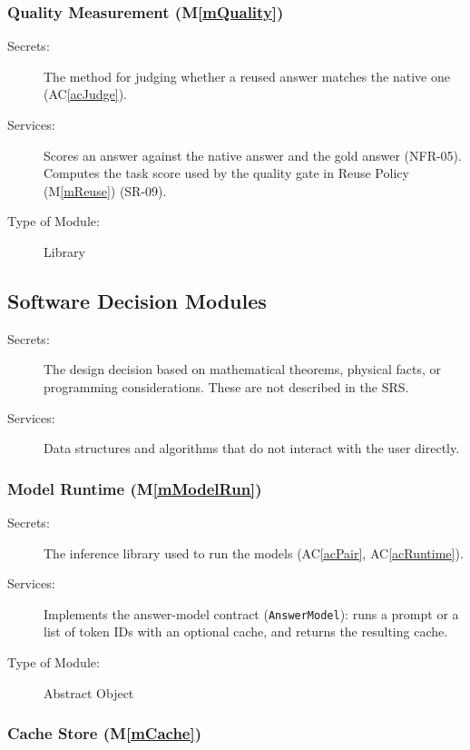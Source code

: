 \documentclass[12pt, titlepage]{article}
\newcommand{\acref}[1]{AC\ref{#1}}
\newcommand{\mref}[1]{M\ref{#1}}
\begin{document}
\subsubsection{Quality Measurement (\mref{mQuality})}

\begin{description}
\item[Secrets:] The method for judging whether a reused answer matches the native one (\acref{acJudge}).
\item[Services:] Scores an answer against the native answer and the gold
  answer (NFR-05). Computes the task score used by the quality gate in
  Reuse Policy (\mref{mReuse}) (SR-09).
\item[Type of Module:] Library
\end{description}

\subsection{Software Decision Modules}

\begin{description}
\item[Secrets:] The design decision based on mathematical theorems, physical
  facts, or programming considerations. These are not described in the SRS.
\item[Services:] Data structures and algorithms that do not interact with the
  user directly.
\end{description}

\subsubsection{Model Runtime (\mref{mModelRun})}

\begin{description}
\item[Secrets:] The inference library used to run the models (\acref{acPair}, \acref{acRuntime}).
\item[Services:] Implements the answer-model contract (\texttt{AnswerModel}):
  runs a prompt or a list of token IDs with an optional cache, and returns the
  resulting cache.
\item[Type of Module:] Abstract Object
\end{description}

\subsubsection{Cache Store (\mref{mCache})}
\end{document}
